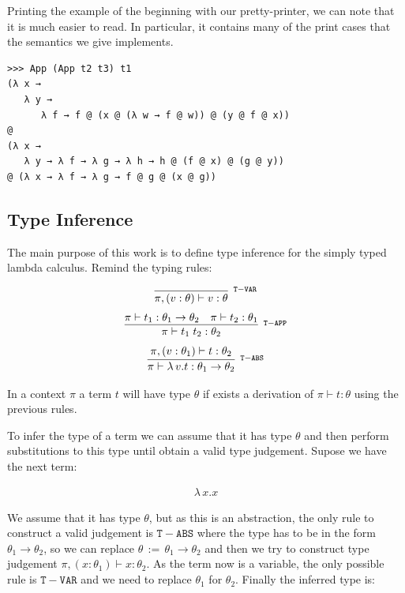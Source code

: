 \documentclass[a4paper,10pt]{article}
\newcommand{\typejud}[3] {
  \ensuremath{#1 \vdash #2 : #3}
}
\begin{document}
Printing the example of the beginning with our pretty-printer, we can note that it is much easier 
to read. In particular, it contains many of the print cases that the semantics we give implements.

\begin{verbatim}
>>> App (App t2 t3) t1
(λ x →
   λ y →
      λ f → f @ (x @ (λ w → f @ w)) @ (y @ f @ x))
@
(λ x →
   λ y → λ f → λ g → λ h → h @ (f @ x) @ (g @ y))
@ (λ x → λ f → λ g → f @ g @ (x @ g))
\end{verbatim}

\subsection{Type Inference}


 The main purpose of this work is to define type inference for the simply typed lambda calculus. Remind the typing rules:
 
 \begin{align*}
 \infer[^{\mathtt{T-VAR}}]
       {\typejud{\pi,(v:\theta)}{v}{\theta}}
       {}
 \end{align*}
  \begin{align*}
  \infer[^{\mathtt{T-APP}}]
       {\typejud{\pi}{t_1\;t_2}{\theta_2}}
       {\typejud{\pi}{t_1}{\theta_1\rightarrow\theta_2} &
        \typejud{\pi}{t_2}{\theta_1}
       }
  \end{align*}
  \begin{align*}
  \infer[^{\mathtt{T-ABS}}]
       {\typejud{\pi}{\lambda\,v.t}{\theta_1 \rightarrow \theta_2}}
       {\typejud{\pi,(v:\theta_1)}{t}{\theta_2}
       }
  \end{align*}
 
 In a context $\pi$ a term $t$ will have type $\theta$ if exists a derivation of
 $\typejud{\pi}{t}{\theta}$ using the previous rules.
 
 To infer the type of a term we can assume that it has type $\theta$ and then perform substitutions
 to this type until obtain a valid type judgement. Supose we have the next term:
 
 \begin{align*}
    \lambda\,x.x
 \end{align*}

 We assume that it has type $\theta$, but as this is an abstraction, the only rule to construct a valid
 judgement is $\mathtt{T-ABS}$ where the type has to be in the form $\theta_1 \rightarrow \theta_2$,
 so we can replace $\theta\,:=\,\theta_1 \rightarrow \theta_2$ and then we try to construct type judgement
 $\typejud{\pi,(x:\theta_1)}{x}{\theta_2}$. As the term now is a variable, the only possible rule
 is $\mathtt{T-VAR}$ and we need to replace $\theta_1$ for $\theta_2$. Finally the inferred type is:
 
\end{document}
